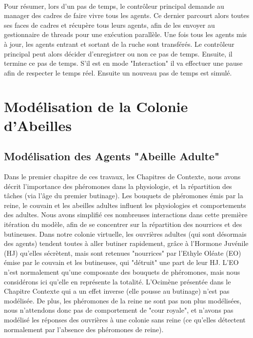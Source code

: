 			\paragraph{}			
			Pour résumer, lors d'un pas de temps, le contrôleur principal demande au manager des cadres de faire vivre tous les agents. Ce dernier parcourt alors toutes ses faces de cadres et récupère tous leurs agents, afin de les envoyer au gestionnaire de threads pour une exécution parallèle. Une fois tous les agents mis à jour, les agents entrant et sortant de la ruche sont transférés. Le contrôleur principal peut alors décider d'enregistrer ou non ce pas de temps. Ensuite, il termine ce pas de temps. S'il est en mode "Interaction" il va effectuer une pause afin de respecter le temps réel. Ensuite un nouveau pas de temps est simulé.
			
	\section{Modélisation de la Colonie d'Abeilles}
	\label{sectionModelColonie}
		\subsection{Modélisation des Agents "Abeille Adulte"}
		
		Dans le premier chapitre de ces travaux, les Chapitres de Contexte, nous avons décrit l'importance des phéromones dans la physiologie, et la répartition des tâches (via l'âge du premier butinage). Les bouquets de phéromones émis par la reine, le couvain et les abeilles adultes influent les physiologies et comportements des adultes. Nous avons simplifié ces nombreuses interactions dans cette première itération du modèle, afin de se concentrer sur la répartition des nourrices et des butineuses. Dans notre colonie virtuelle, les ouvrières adultes (qui sont désormais des agents) tendent toutes à aller butiner rapidement, grâce à l'Hormone Juvénile (HJ) qu'elles sécrètent, mais sont retenues "nourrices" par l'Ethyle Oléate (EO) émise par le couvain et les butineuses, qui "détruit" une part de leur HJ. L'EO n'est normalement qu'une composante des bouquets de phéromones, mais nous considérons ici qu'elle en représente la totalité. L'Ocimène présentée dans le Chapitre Contexte qui a un effet inverse (elle pousse au butinage) n'est pas modélisée. De plus, les phéromones de la reine ne sont pas non plus modélisées, nous n'attendons donc pas de comportement de "cour royale", et n'avons pas modélisé les réponses des ouvrières à une colonie sans reine (ce qu'elles détectent normalement par l'absence des phéromones de reine).
		
